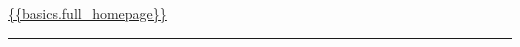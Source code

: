 \documentclass[a4paper, 10pt]{article}
\begin{document}
\begin{flushright}
  \item {}  %
  \item {\Calluna \url{ {{basics.full_homepage}}}}  %
\end{flushright}\vspace{-45pt}

\begin{flushleft}  %
  {\Calluna \fontsize{30pt}{30pt}\selectfont \textsc{} } \quad {\Calluna \fontsize{14.5pt}{14.5pt}}
  \noindent\rule{\textwidth}{0.4pt}
\end{flushleft}
\end{document}
